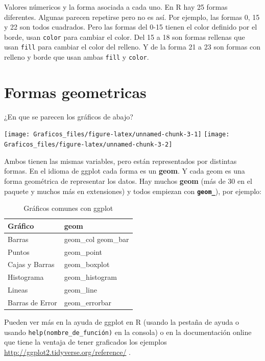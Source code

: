 \documentclass[]{book}
\theoremstyle{definition}
\theoremstyle{definition}
\theoremstyle{definition}
\theoremstyle{remark}
\begin{document}
Valores númericos y la forma asociada a cada uno. En R hay 25 formas
diferentes. Algunas parecen repetirse pero no es así. Por ejemplo, las
formas 0, 15 y 22 son todos cuadrados. Pero las formas del 0-15 tienen
el color definido por el borde, usan \texttt{color} para cambiar el
color. Del 15 a 18 son formas rellenas que usan \texttt{fill} para
cambiar el color del relleno. Y de la forma 21 a 23 son formas con
relleno y borde que usan ambas \texttt{fill} y \texttt{color}.

\hypertarget{formas-geometricas}{%
\section{Formas geometricas}\label{formas-geometricas}}

¿En que se parecen los gráficos de abajo?

\texttt{[image: Graficos\_files/figure-latex/unnamed-chunk-3-1]}
\texttt{[image: Graficos\_files/figure-latex/unnamed-chunk-3-2]}

Ambos tienen las mismas variables, pero están representados por
distintas formas. En el idioma de ggplot cada forma es un \textbf{geom}.
Y cada geom es una forma geométrica de representar los datos. Hay muchos
\textbf{geom} (más de 30 en el paquete y muchos más en extensiones) y
todos empiezan con \textbf{\texttt{geom\_}}), por ejemplo:

\begin{table}

\caption{\label{tab:Graficos-Comunes}Gráficos comunes con ggplot}
\centering
\begin{tabular}[t]{l|l}
\hline
Gráfico & geom\\
\hline
Barras & geom\_col geom\_bar\\
\hline
Puntos & geom\_point\\
\hline
Cajas y Barras & geom\_boxplot\\
\hline
Histograma & geom\_histogram\\
\hline
Lineas & geom\_line\\
\hline
Barras de Error & geom\_errorbar\\
\hline
\end{tabular}
\end{table}

Pueden ver más en la ayuda de ggplot en R (usando la pestaña de ayuda o
usando \texttt{help(nombre\_de\_función)} en la consola) o en la
documentación online que tiene la ventaja de tener graficados los
ejemplos \url{http://ggplot2.tidyverse.org/reference/} .
\end{document}
